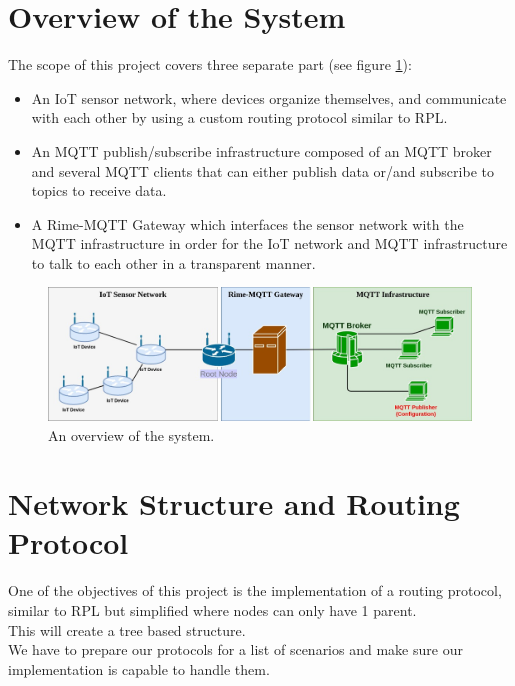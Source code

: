 \documentclass[a4paper,11pt]{article}
\begin{document}

\section{Overview of the System}
The scope of this project covers three separate part (see figure \ref{fig:architecture1}):
\begin{itemize}
\item{An IoT sensor network, where devices organize themselves, and communicate with each other by using a custom routing protocol similar to RPL.}
\item{An MQTT publish/subscribe infrastructure composed of an MQTT broker and several MQTT clients that can either publish data or/and subscribe to topics to receive data.}
\item{A Rime-MQTT Gateway which interfaces the sensor network with the MQTT infrastructure in order for the IoT network and MQTT infrastructure to talk to each other in a transparent manner.}
\end{itemize}

\begin{figure}
  \includegraphics[width=\linewidth]{img/architecture-2.jpg}
  \caption{An overview of the system.}
  \label{fig:architecture1}
\end{figure}
\section{Network Structure and Routing Protocol}
One of the objectives of this project is the implementation of a routing protocol, similar to RPL but simplified where nodes can only have 1 parent.\\
This will create a tree based structure.\\
We have to prepare our protocols for a list of scenarios and make sure our implementation is capable to handle them.
\end{document}
